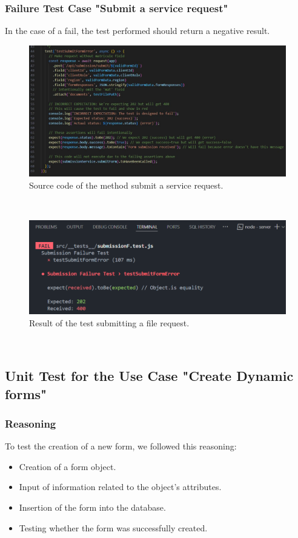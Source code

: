 \subsubsection{Failure Test Case "Submit a service request"}
In the case of a fail, the test performed should return a negative result.
\begin{figure}[h!]
    \centering
    \includegraphics[width=1\textwidth]{figures/subFcode.JPG}
    \caption{Source code of the method submit a service request.}
\end{figure} \
\begin{figure}[h!]
    \centering
    \includegraphics[width=1\textwidth]{figures/test fail submit service request.png}  
    \caption{Result of the test submitting a file request.}
\end{figure} \



\subsection{ Unit Test for the Use Case "Create Dynamic forms"}
\subsubsection{Reasoning} 
To test the creation of a new form, we followed this reasoning:\\  
\begin{itemize}
    \item Creation of a form object.  
   \item Input of information related to the object's attributes.  
\item Insertion of the form into the database.  
\item Testing whether the form was successfully created.
\end{itemize}
